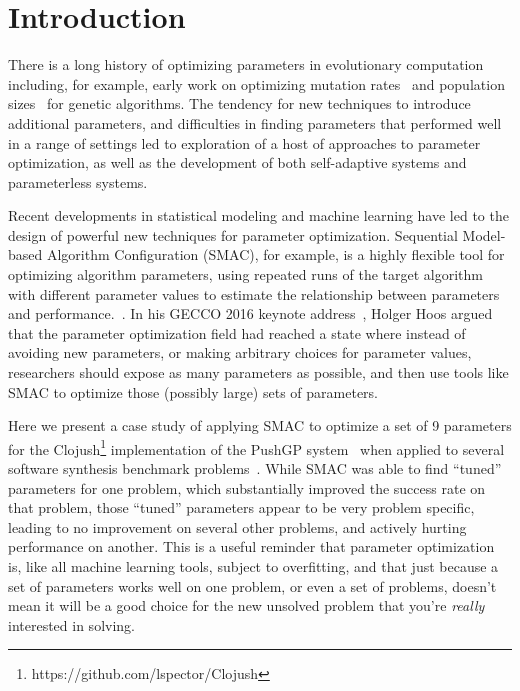 \section{Introduction}
\label{sec:introduction}

There is a long history of optimizing parameters in evolutionary computation
including, for example, early work on optimizing mutation rates~\cite{back1993optimal} and 
population sizes~\cite{alander1992optimal} for genetic algorithms.
The tendency for new techniques to introduce additional parameters, 
and difficulties in finding parameters that performed well in a range of
settings led to exploration of a host of approaches to parameter
optimization, as well as the development of both self-adaptive systems
and parameterless systems.~\cite{lobo2007parameter}

Recent developments in statistical modeling and machine learning have
led to the design of powerful new techniques for parameter optimization. 
Sequential Model-based Algorithm Configuration (SMAC), for example, is a
highly flexible tool for optimizing algorithm parameters, using repeated runs
of the target algorithm with different parameter values to estimate
the relationship between parameters and performance.~\cite{HutHooLey11-SMAC}. In his GECCO 2016 keynote 
address~\cite{Hoos:2016:TCM:2908812.2908960}, Holger Hoos argued
that the parameter optimization field had reached a state where 
instead of avoiding new
parameters, or making arbitrary choices for parameter values, researchers
should expose as many parameters as possible, and then use tools like
SMAC to optimize those (possibly large) sets of parameters.

Here we present a case study of applying SMAC to optimize a
set of 9 parameters for the Clojush\footnote{https://github.com/lspector/Clojush} 
implementation of the PushGP system~\cite{spector:2002:GPEM,push3gecco}
when applied to several software synthesis 
benchmark problems~\cite{Helmuth:2015:GECCO}. While SMAC was able to
find ``tuned'' parameters for one problem, which substantially improved
the success rate on that problem, those ``tuned'' parameters appear to
be very problem specific, leading to no improvement on several other
problems, and actively hurting performance on another. This is a useful
reminder that parameter optimization is, like all machine learning tools,
subject to overfitting, and that just because a set of parameters works 
well on one problem, or even a set of problems, doesn't mean it will be
a good choice for the new unsolved problem that you're \emph{really}
interested in solving.


